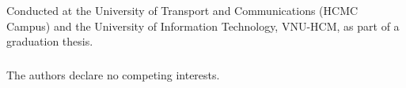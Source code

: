 \documentclass[runningheads]{llncs}
\begin{document}
\begin{credits}
\subsubsection{\ackname} Conducted at the University of Transport and Communications (HCMC Campus) and the University of Information Technology, VNU-HCM, as part of a graduation thesis.
\subsubsection{\discintname} The authors declare no competing interests.
\end{credits}



\end{document}
